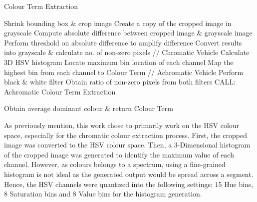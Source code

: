  
 \begin{algorithm}[!ht]
  \caption{Colour Term Extraction}
  \label{algo:colorExtract}
  \begin{algorithmic}[1]
        \STATE Shrink bounding box \& crop image
        \STATE Create a copy of the cropped image in grayscale
        \STATE Compute absolute difference between cropped image \& grayscale image
        \STATE Perform threshold on absolute difference to amplify difference
        \STATE Convert results into grayscale \& calculate no. of non-zero pixels
                \STATE // Chromatic Vehicle
                \STATE Calculate 3D HSV histogram  
                \STATE Locate maximum bin location of each channel
                \STATE Map the highest bin from each channel to Colour Term
            \ELSE 
                \STATE // Achromatic Vehicle
                \STATE Perform black \& white filter 
                \STATE Obtain ratio of non-zero pixels from both filters
                \STATE CALL: Achromatic Colour Term Extraction
            \ENDIF

    \ENDFOR
    \STATE Obtain average dominant colour \& return Colour Term
  \end{algorithmic}
\end{algorithm}


As previously mention, this work chose to primarily work on the HSV colour space, especially for the chromatic colour extraction process. First, the cropped image was converted to the HSV colour space. Then, a 3-Dimensional histogram of the cropped image was generated to identify the maximum value of each channel. However, as colours belongs to a spectrum, using a fine-grained histogram is not ideal as the generated output would be spread across a segment. Hence, the HSV channels were quantized into the following settings: 15 Hue bins, 8 Saturation bins and 8 Value bins for the histogram generation. 






